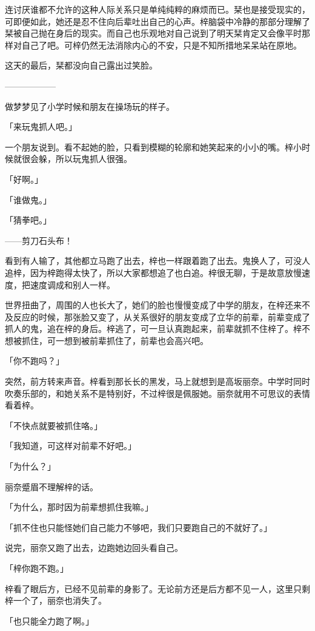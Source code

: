\documentclass[UTF8]{ctexart}
\begin{document}
    连讨厌谁都不允许的这种人际关系只是单纯纯粹的麻烦而已。栞也是接受现实的，可即便如此，她还是忍不住向后辈吐出自己的心声。梓脑袋中冷静的那部分理解了栞被自己抛在身后的现实。而自己也乐观地对自己说到了明天栞肯定又会像平时那样对自己了吧。可梓仍然无法消除内心的不安，只是不知所措地呆呆站在原地。

    这天的最后，栞都没向自己露出过笑脸。

    ——————

    做梦梦见了小学时候和朋友在操场玩的样子。

    「来玩鬼抓人吧。」

    一个朋友说到。看不起她的脸，只看到模糊的轮廓和她笑起来的小小的嘴。梓小时候就很会躲，所以玩鬼抓人很强。

    「好啊。」

    「谁做鬼。」

    「猜拳吧。」

    ——剪刀石头布！

    看到有人输了，其他都立马跑了出去，梓也一样跟着跑了出去。鬼换人了，可没人追梓，因为梓跑得太快了，所以大家都想追了也白追。梓很无聊，于是故意放慢速度，把速度调成和别人一样。

    世界扭曲了，周围的人也长大了，她们的脸也慢慢变成了中学的朋友，在梓还来不及反应的时候，那张脸又变了，从关系很好的朋友变成了立华的前辈，前辈变成了抓人的鬼，追在梓的身后。梓逃了，可一旦认真跑起来，前辈就抓不住梓了。梓不想被抓住，可一想到被前辈抓住了，前辈也会高兴吧。

    「你不跑吗？」

    突然，前方转来声音。梓看到那长长的黑发，马上就想到是高坂丽奈。中学时同时吹奏乐部的，和她关系不是特别好，不过梓很是佩服她。丽奈就用不可思议的表情看着梓。

    「不快点就要被抓住咯。」

    「我知道，可这样对前辈不好吧。」

    「为什么？」

    丽奈蹙眉不理解梓的话。

    「为什么，那时因为前辈想抓住我嘛。」

    「抓不住也只能怪她们自己能力不够吧，我们只要跑自己的不就好了。」

    说完，丽奈又跑了出去，边跑她边回头看自己。

    「梓你跑不跑。」

    梓看了眼后方，已经不见前辈的身影了。无论前方还是后方都不见一人，这里只剩梓一个了，丽奈也消失了。

    「也只能全力跑了啊。」
\end{document}
